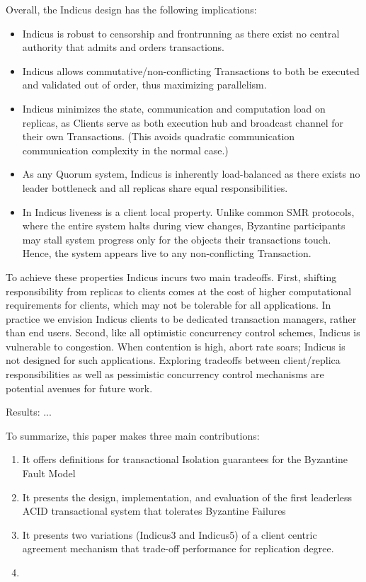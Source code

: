 Overall, the Indicus design has the following implications:
\begin{itemize}%

\item Indicus is robust to censorship and frontrunning as there exist no central authority that admits and orders transactions.
\item Indicus allows commutative/non-conflicting Transactions to both be executed and validated out of order, thus maximizing parallelism. 
\item Indicus minimizes the state, communication and computation load on replicas, as Clients serve as both execution hub and broadcast channel for their own Transactions. (This avoids quadratic communication communication complexity in the normal case.) 
\item As any Quorum system, Indicus is inherently load-balanced as there exists no leader bottleneck and all replicas share equal responsibilities.
\item In Indicus liveness is a client local property. Unlike common SMR protocols, where the entire system halts during view changes, Byzantine participants may stall system progress only for the objects their transactions touch. Hence, the system appears live to any non-conflicting Transaction.
\end{itemize}

To achieve these properties Indicus incurs two main tradeoffs. First, shifting responsibility from replicas to clients comes at the cost of higher computational requirements for clients, which may not be tolerable for all applications. In practice we envision Indicus clients to be dedicated transaction managers, rather than end users. Second, like all optimistic concurrency control schemes, Indicus is vulnerable to congestion. When contention is high, abort rate soars; Indicus is not designed for such applications. Exploring tradeoffs between client/replica responsibilities as well as pessimistic concurrency control mechanisms are potential avenues for future work.

Results:  ...

To summarize, this paper makes three main contributions:
\begin{enumerate}
\item It offers definitions for transactional Isolation guarantees for the Byzantine Fault Model
\item It presents the design, implementation, and evaluation of the first leaderless ACID transactional system that tolerates Byzantine Failures
\item It presents two variations (Indicus3 and Indicus5) of a client centric agreement mechanism that trade-off performance for replication degree.  
\item {}
\end{enumerate}

